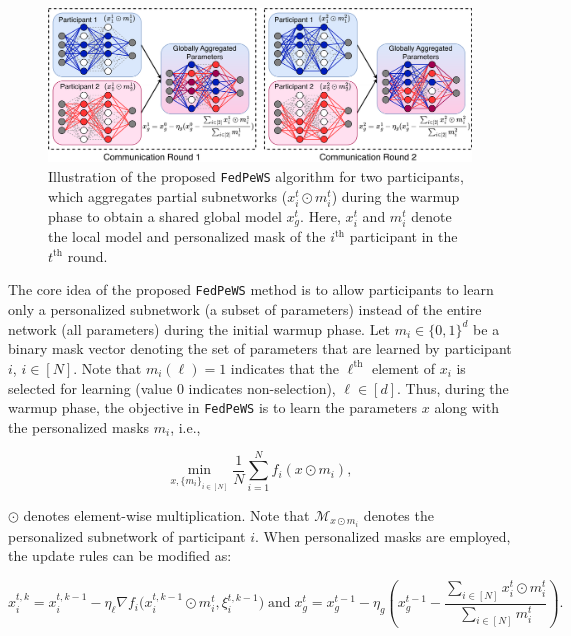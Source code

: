 \documentclass{article}
\begin{document}
\begin{figure}
    \centering
    \includegraphics[width=\linewidth]{images/fedpews_V2-1200.pdf}
    \caption{Illustration of the proposed \texttt{FedPeWS} algorithm for two participants, which aggregates partial subnetworks ($x_i^t \odot m_i^t$) during the warmup phase to obtain a shared global model $x_g^t$. Here, $x_i^t$ and $m_i^t$ denote the local model and personalized mask of the $i^{\text{th}}$ participant in the $t^{\text{th}}$ round.}
    \label{fig: fedpews-masked-aggregation}
\end{figure}

The core idea of the proposed \texttt{FedPeWS} method is to allow participants to learn only a personalized subnetwork (a subset of parameters) instead of the entire network (all parameters) during the initial warmup phase. Let $m_i \in \{0,1\}^d$ be a binary mask vector denoting the set of parameters that are learned by participant $i$, $i \in [N]$. Note that $m_i(\ell) = 1$ indicates that the $\ell^{\textrm{th}}$ element of $x_i$ is selected for learning (value $0$ indicates non-selection), $\ell \in [d]$. Thus, during the warmup phase, the objective in \texttt{FedPeWS} is to learn the parameters $x$ along with the personalized masks $m_i$, i.e., 

\begin{equation}
    \label{eq: mask learning}
    \min_{x, \{m_i\}_{i\in[N]}} \frac{1}{N} \sum_{i=1}^N f_i(x \odot m_i),
\end{equation}

\noindent $\odot$ denotes element-wise multiplication. Note that $\mathcal{M}_{x \odot m_i}$ denotes the personalized subnetwork of participant $i$. When personalized masks are employed, the update rules can be modified as:

\begin{equation}
    x_{i}^{t,k} = x_{i}^{t,k-1} - \eta_{\ell} \nabla f_i\big(x_i^{t,k-1} \odot m_i^t, \xi_i^{t,k-1}\big) \; \text{and} \; x_g^{t} = x_g^{t-1} - \eta_g (x_g^{t-1} - \frac{\sum_{i \in [N]}x_{i}^{t} \odot m_i^t}{\sum_{i \in [N]}m_i^t}).
\end{equation}
\end{document}
